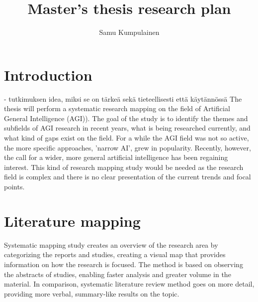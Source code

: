 \documentclass[utf8,english]{gradu3}
\begin{document}
\title{Master's thesis research plan}

\author{Samu Kumpulainen}

\maketitle
\bigskip


\mainmatter

\section{Introduction}
- tutkimuksen idea, miksi se on tärkeä sekä tieteellisesti että käytännössä
The thesis will perform a systematic research mapping on the field of Artificial General Intelligence (AGI)). The goal of the study is to identify the themes and subfields of AGI research in recent years, what is being researched currently, and what kind of gaps exist on the field. For a while the AGI field was not so active, the more specific approaches, 'narrow AI', grew in popularity. Recently, however, the call for a wider, more general artificial intelligence has been regaining interest. This kind of research mapping study would be needed as the research field is complex and there is no clear presentation of the current trends and focal points. 
\section{Literature mapping} 
Systematic mapping study creates an overview of the research area by categorizing the reports and studies, creating a visual map that provides information on how the research is focused. The method is based on observing the abstracts of studies, enabling faster analysis and greater volume in the material. In comparison, systematic literature review method goes on more detail, providing more verbal, summary-like results on the topic. 
\end{document}
